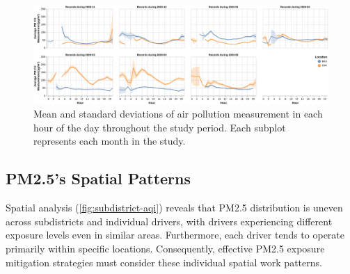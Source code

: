 \begin{figure}
    \centering
    \includegraphics[width=\textwidth]{figures/average-hourly-pollution.pdf}%
    \caption{Mean and standard deviations of air pollution measurement in each hour of the day throughout the study period.
    Each subplot represents each month in the study. }%
    \Description{}
    \label{fig:hourly-work-aqi}%
\end{figure}%



\subsection{PM2.5's Spatial Patterns}

Spatial analysis (\autoref{fig:subdistrict-aqi}) reveals that PM2.5 distribution is uneven across subdistricts and individual drivers, with drivers experiencing different exposure levels even in similar areas.
Furthermore, each driver tends to operate primarily within specific locations.
Consequently, effective PM2.5 exposure mitigation strategies must consider these individual spatial work patterns.



